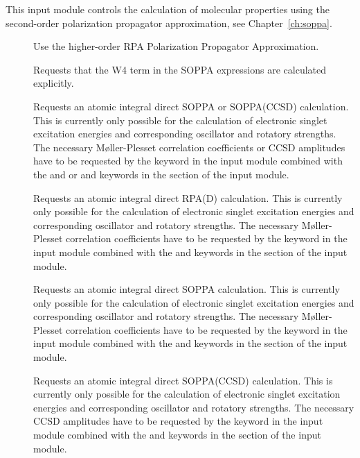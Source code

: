 This input module controls the calculation of molecular properties
using the second-order polarization propagator approximation, see
Chapter~\ref{ch:soppa}.

\begin{description}
\item[] Use the higher-order RPA Polarization Propagator
  Approximation.

\item[] Requests that the W4 term in the SOPPA expressions
  are calculated explicitly.

\item[] Requests an atomic integral direct SOPPA or
SOPPA(CCSD) calculation. This is currently only possible for the
calculation of electronic singlet excitation energies and corresponding
oscillator and rotatory strengths. The necessary M{\o}ller-Plesset
correlation coefficients or CCSD amplitudes have to be requested by the
 keyword in the  input module combined
with the  and  or  and 
keywords in the  section of the 
input module.

\item[] Requests an atomic integral direct RPA(D)
calculation. This is currently only possible for the calculation of
electronic singlet excitation energies and corresponding oscillator and
rotatory strengths. The necessary M{\o}ller-Plesset correlation
coefficients have to be requested by the  keyword in the
 input module combined with the  and
 keywords in the  section of the  input module.

\item[] Requests an atomic integral direct SOPPA
calculation. This is currently only possible for the calculation of
electronic singlet excitation energies and corresponding oscillator and
rotatory strengths. The necessary M{\o}ller-Plesset correlation
coefficients have to be requested by the  keyword in the
 input module combined with the  and
 keywords in the  section of the  input module.

\item[] Requests an atomic integral direct SOPPA(CCSD)
calculation. This is currently only possible for the calculation of
electronic singlet excitation energies and corresponding oscillator and
rotatory strengths. The necessary CCSD amplitudes have to be requested
by the  keyword in the  input module
combined with the  and  keywords in the  section of the  input module.


\end{description}
